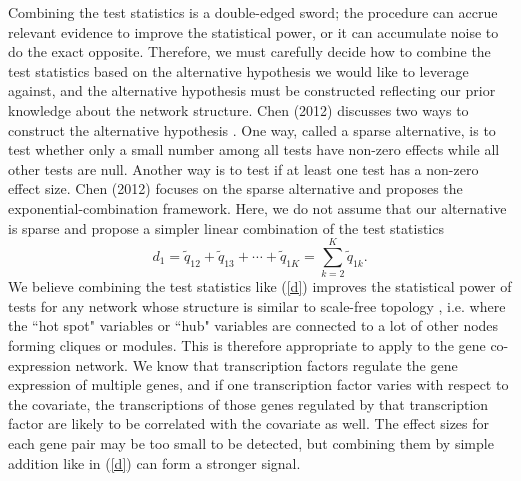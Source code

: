\documentclass[12pt]{extarticle}
\theoremstyle{theorem}
\begin{document}
\noindent
Combining the test statistics is a double-edged sword; the procedure can accrue relevant evidence to improve the statistical power, or it can accumulate noise to do the exact opposite. Therefore, we must carefully decide how to combine the test statistics based on the alternative hypothesis we would like to leverage against, and the alternative hypothesis must be constructed reflecting our prior knowledge about the network structure. Chen (2012) discusses two ways to construct the alternative hypothesis \cite{chen2012exponential}. One way, called a sparse alternative, is to test whether only a small number among all tests have non-zero effects while all other tests are null. Another way is to test if at least one test has a non-zero effect size. Chen (2012) focuses on the sparse alternative and proposes the exponential-combination framework. Here, we do not assume that our alternative is sparse and propose a simpler linear combination of the test statistics
\begin{equation}
d_1 = \tilde{q}_{12} + \tilde{q}_{13} + \cdots + \tilde{q}_{1K} = \sum_{k=2}^{K} \tilde{q}_{1k}.
\label{d}
\end{equation}
We believe combining the test statistics like (\ref{d}) improves the statistical power of tests for any network whose structure is similar to scale-free topology \cite{horvath2008geometric}, i.e. where the ``hot spot" variables or ``hub" variables are connected to a lot of other nodes forming cliques or modules. This is therefore appropriate to apply to the gene co-expression network. We know that transcription factors regulate the gene expression of multiple genes, and if one transcription factor varies with respect to the covariate, the transcriptions of those genes regulated by that transcription factor are likely to be correlated with the covariate as well. The effect sizes for each gene pair may be too small to be detected, but combining them by simple addition like in (\ref{d}) can form a stronger signal.
\end{document}
